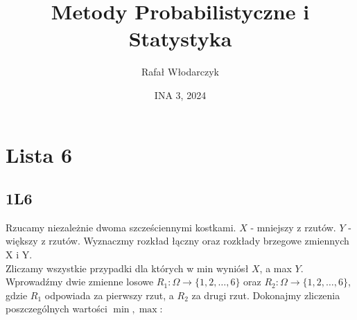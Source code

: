 \documentclass{article}
\title{Metody Probabilistyczne i Statystyka}
\author{Rafał Włodarczyk}
\date{INA 3, 2024}
\begin{document}
\maketitle

\tableofcontents

\newpage

\section{Lista 6}

\subsection{1L6}

Rzucamy niezależnie dwoma szcześciennymi kostkami. $X$ - mniejszy z rzutów.
$Y$ - większy z rzutów. Wyznaczmy rozkład łączny oraz rozkłady brzegowe zmiennych X i Y.\\

\noindent
Zliczamy wszystkie przypadki dla których w min wyniósł $X$, a max $Y$. Wprowadźmy dwie zmienne losowe
$R_1: \Omega \rightarrow \{1,2,\dots,6\}$ oraz $R_2: \Omega \rightarrow \{1,2,\dots,6\}$, gdzie $R_1$ odpowiada za pierwszy rzut,
a $R_2$ za drugi rzut. Dokonajmy zliczenia poszczególnych wartości $\min,\max$:
\end{document}
